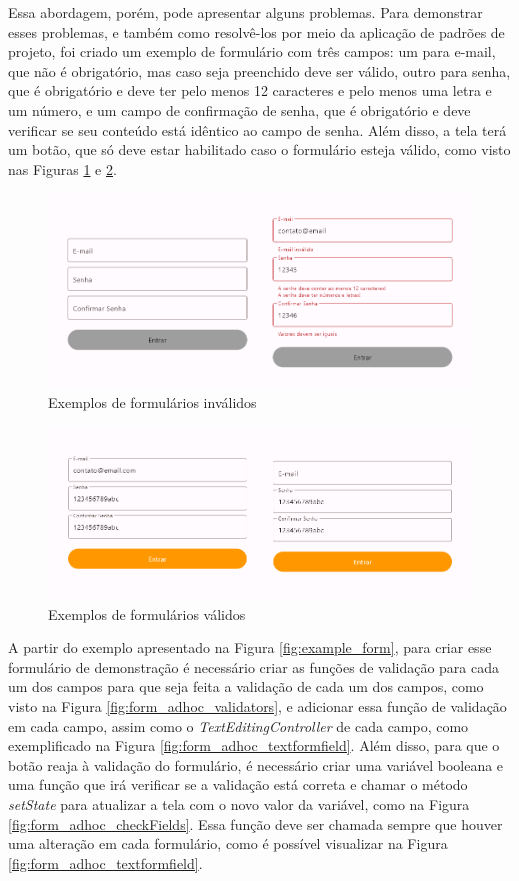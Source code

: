 \documentclass[12pt, %
openright, 
oneside, %
a4paper,    %
brazil]{facom-ufu-abntex2}
\begin{document}
Essa abordagem, porém, pode apresentar alguns problemas. Para demonstrar esses problemas, e também como resolvê-los por meio da aplicação de padrões de projeto, foi criado um exemplo de formulário com três campos: um para e-mail, que não é obrigatório, mas caso seja preenchido deve ser válido, outro para senha, que é obrigatório e deve ter pelo menos 12 caracteres e pelo menos uma letra e um número, e um campo de confirmação de senha, que é obrigatório e deve verificar se seu conteúdo está idêntico ao campo de senha. Além disso, a tela terá um botão, que só deve estar habilitado caso o formulário esteja válido, como visto nas Figuras \ref{fig:form_preview_invalid} e \ref{fig:form_preview_valid}.

\begin{figure}[ht]
    \centering
    \includegraphics[width=.65\textwidth]{figures/forms/form_preview_invalid.png}
    \caption{Exemplos de formulários inválidos}
    \label{fig:form_preview_invalid}
\end{figure}

\begin{figure}[ht]
    \centering
    \includegraphics[width=.65\textwidth]{figures/forms/form_preview_valid.png}
    \caption{Exemplos de formulários válidos}
    \label{fig:form_preview_valid}
\end{figure}

A partir do exemplo apresentado na Figura \ref{fig:example_form}, para criar esse formulário de demonstração é necessário criar as funções de validação para cada um dos campos para que seja feita a validação de cada um dos campos, como visto na Figura \ref{fig:form_adhoc_validators}, e adicionar essa função de validação em cada campo, assim como o \textit{TextEditingController} de cada campo, como exemplificado na Figura \ref{fig:form_adhoc_textformfield}. Além disso, para que o botão reaja à validação do formulário, é necessário criar uma variável booleana e uma função que irá verificar se a validação está correta e chamar o método \textit{setState} para atualizar a tela com o novo valor da variável, como na Figura \ref{fig:form_adhoc_checkFields}. Essa função deve ser chamada sempre que houver uma alteração em cada formulário, como é possível visualizar na Figura \ref{fig:form_adhoc_textformfield}.
\end{document}
